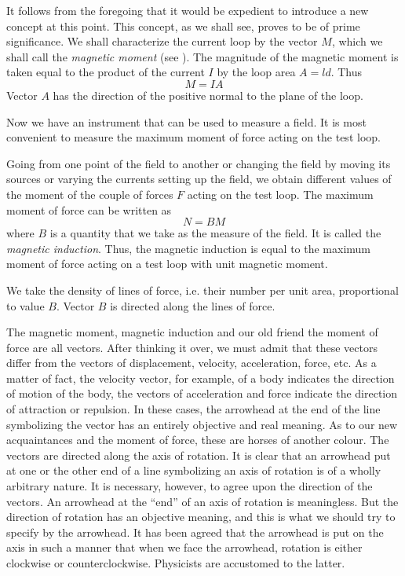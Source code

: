 It follows from the foregoing that it would be expedient to introduce a new concept at this point. This concept, as we shall see, proves to be of prime significance. We shall characterize the current loop by the vector $M$, which we shall call the \emph{magnetic moment} (see ). The magnitude of the magnetic moment is taken equal to the product of the current $I$ by the loop area $A=ld$. Thus
\begin{equation*}%
M=IA
\end{equation*}
Vector $A$ has the direction of the positive normal to the plane of the loop.

Now we have an instrument that can be used to measure a field. It is most convenient to measure the maximum moment of force acting on the test loop.

Going from one point of the field to another or changing the field by moving its sources or varying the currents setting up the field, we obtain different values of the moment of the couple of forces $F$ acting on the test loop. The maximum moment of force can be written as
\begin{equation*}%
N = BM
\end{equation*}
where $B$ is a quantity that we take as the measure of the field. It is called the \emph{magnetic induction}. Thus, the magnetic induction is equal to the maximum moment of force acting on a test loop with unit magnetic moment.

We take the density of lines of force, i.e. their number per unit area, proportional to value $B$. Vector $B$ is directed along the lines of force.


The magnetic moment, magnetic induction and our old friend the moment of force are all vectors. After thinking it over, we must admit that these vectors differ from the vectors of displacement, velocity, acceleration, force, etc. As a matter of fact, the velocity vector, for example, of a body indicates the direction of motion of the body, the vectors of acceleration and force indicate the direction of attraction or repulsion. In these cases, the arrowhead at the end of the line symbolizing the vector has an entirely objective and real meaning. As to our new acquaintances and the moment of force, these are horses of another colour. The vectors are directed along the axis of rotation. It is clear that an arrowhead put at one or the other end of a line symbolizing an axis of rotation is of a wholly arbitrary nature. It is necessary, however, to agree upon the direction of the vectors. An arrowhead at the ``end'' of an axis of rotation is meaningless. But the direction of rotation has an objective meaning, and this is what we should try to specify by the arrowhead. It has been agreed that the arrowhead is put on the axis in such a manner that when we face the arrowhead, rotation is either clockwise or counterclockwise. Physicists are accustomed to the latter.

